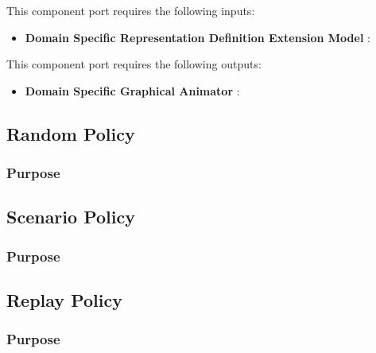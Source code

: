 \documentclass{gemoc} %
\begin{document}
This component port requires the following inputs:
\begin{itemize}
  \item \textbf{Domain Specific Representation Definition Extension Model} :
\end{itemize}

This component port requires the following outputs:
\begin{itemize}
  \item \textbf{Domain Specific Graphical Animator} :
\end{itemize}

\subsection{Random Policy}


\subsubsection{Purpose}



\subsection{Scenario Policy}


\subsubsection{Purpose}



\subsection{Replay Policy}


\subsubsection{Purpose}
\end{document}
